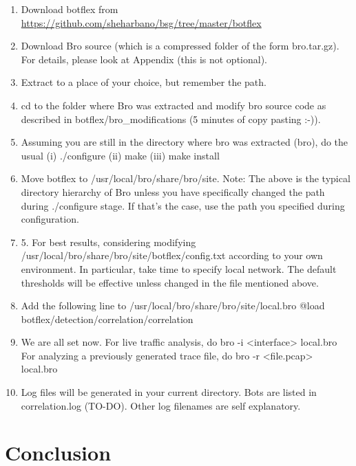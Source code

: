 \documentclass[acmtocl]{acmtrans2m}
\begin{document}
\begin{enumerate}
\item Download botflex from
\url{https://github.com/sheharbano/bsg/tree/master/botflex}
\item Download Bro source (which is a compressed folder of the form 
	bro.tar.gz). For details, please look at Appendix (this is not optional).
\item Extract to a place of your choice, but remember the path.
\item cd to the folder where Bro was extracted and modify bro source code as 
   described in botflex/bro\_modifications (5 minutes of copy pasting :-)). 
\item Assuming you are still in the directory where bro was extracted (bro),
   do the usual (i) ./configure (ii) make (iii) make install
\item Move botflex to /usr/local/bro/share/bro/site.
   Note: The above is the typical directory hierarchy of Bro unless you have	
         specifically changed the path during ./configure stage. If that's
	 the case, use the path you specified during configuration.
\item 5. For best results, considering modifying 
   /usr/local/bro/share/bro/site/botflex/config.txt
   according to your own environment. In particular, take time to
   specify local network. The default thresholds will be effective unless
   changed in the file mentioned above.
\item Add the following line to /usr/local/bro/share/bro/site/local.bro
   @load botflex/detection/correlation/correlation
\item We are all set now. For live traffic analysis, do 
   bro -i <interface> local.bro
   For analyzing a previously generated trace file, do
   bro -r <file.pcap> local.bro
\item Log files will be generated in your current directory. Bots are 
   listed in correlation.log (TO-DO). Other log filenames are self 
   explanatory.
\end{enumerate}
\section{Conclusion}

\appendix
\end{document}
